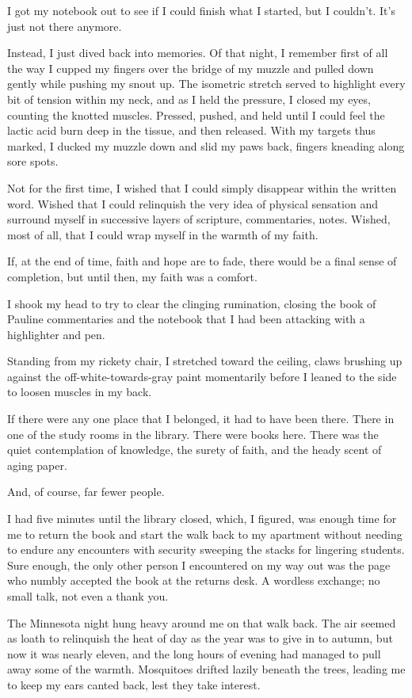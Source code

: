 I got my notebook out to see if I could finish what I started, but I couldn't. It's just not there anymore.

Instead, I just dived back into memories. Of that night, I remember first of all the way I cupped my fingers over the bridge of my muzzle and pulled down gently while pushing my snout up. The isometric stretch served to highlight every bit of tension within my neck, and as I held the pressure, I closed my eyes, counting the knotted muscles. Pressed, pushed, and held until I could feel the lactic acid burn deep in the tissue, and then released. With my targets thus marked, I ducked my muzzle down and slid my paws back, fingers kneading along sore spots.

Not for the first time, I wished that I could simply disappear within the written word. Wished that I could relinquish the very idea of physical sensation and surround myself in successive layers of scripture, commentaries, notes. Wished, most of all, that I could wrap myself in the warmth of my faith.

If, at the end of time, faith and hope are to fade, there would be a final sense of completion, but until then, my faith was a comfort.

I shook my head to try to clear the clinging rumination, closing the book of Pauline commentaries and the notebook that I had been attacking with a highlighter and pen.

Standing from my rickety chair, I stretched toward the ceiling, claws brushing up against the off-white-towards-gray paint momentarily before I leaned to the side to loosen muscles in my back.

If there were any one place that I belonged, it had to have been there. There in one of the study rooms in the library. There were books here. There was the quiet contemplation of knowledge, the surety of faith, and the heady scent of aging paper.

And, of course, far fewer people.

I had five minutes until the library closed, which, I figured, was enough time for me to return the book and start the walk back to my apartment without needing to endure any encounters with security sweeping the stacks for lingering students. Sure enough, the only other person I encountered on my way out was the page who numbly accepted the book at the returns desk. A wordless exchange; no small talk, not even a thank you.

The Minnesota night hung heavy around me on that walk back. The air seemed as loath to relinquish the heat of day as the year was to give in to autumn, but now it was nearly eleven, and the long hours of evening had managed to pull away some of the warmth. Mosquitoes drifted lazily beneath the trees, leading me to keep my ears canted back, lest they take interest.

